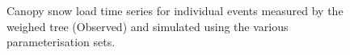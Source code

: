 \documentclass[
  letterpaper,
  DIV=11,
  numbers=noendperiod]{scrartcl}
\begin{document}
\begin{figure}[H]


\caption{\label{fig-obs-mod-w-tree}Canopy snow load time series for
individual events measured by the weighed tree (Observed) and simulated
using the various parameterisation sets.}

\end{figure}%
\end{document}
